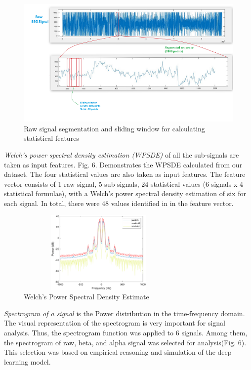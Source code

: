 \documentclass[conference]{IEEEtran}
\begin{document}
\begin{figure}[htbp]
\hbox{\hspace{-0.8em}\includegraphics[scale=.08]{figures/Plot_example.png}}
\caption{Raw signal segmentation and sliding window for calculating statistical features}
\label{fig}
\end{figure}

\textit{Welch’s power spectral density estimation (WPSDE)} of all the sub-signals are taken as input features. Fig. 6. Demonstrates the WPSDE calculated from our dataset. The four statistical values are also taken as input features. The feature vector consists of 1 raw signal, 5 sub-signals, 24 statistical values (6 signals x 4 statistical formulae), with a Welch’s power spectral density estimation of six for each signal. In total, there were 48 values identified in in the feature vector.
 


\begin{figure}[htbp]
\centerline{\includegraphics[width=8cm, height=4cm]{figures/welch.png}}
\caption{Welch’s Power Spectral Density Estimate}
\label{fig}
\end{figure}

\textit{Spectrogram of a signal} is the Power distribution in the time-frequency domain. The visual representation of the spectrogram is very important for signal analysis. Thus, the spectrogram function was applied to 6 signals. Among them, the spectrogram of raw, beta, and alpha signal was selected for analysis(Fig. 6). This selection was based on empirical reasoning and simulation of the deep learning model.
\end{document}
